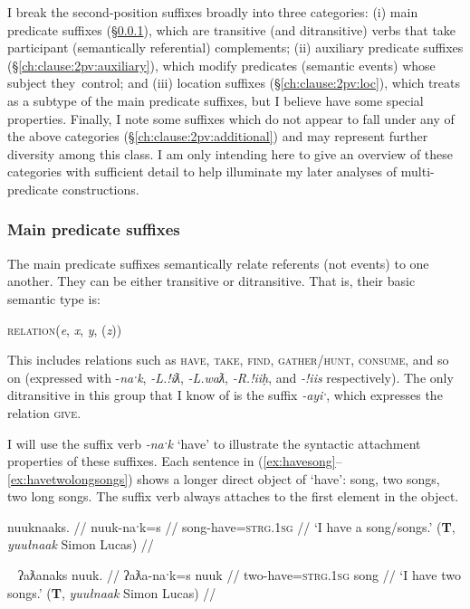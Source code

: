 I break the second-position suffixes broadly into three categories: (i) main predicate suffixes (\S\ref{ch:clause:2pv:mainpredicate}), which are transitive (and ditransitive) verbs that take participant (semantically referential) complements; (ii) auxiliary predicate suffixes (\S\ref{ch:clause:2pv:auxiliary}), which modify predicates (semantic events) whose subject they control; and (iii) location suffixes (\S\ref{ch:clause:2pv:loc}), which \citet{wojdak2005} treats as a subtype of the main predicate suffixes, but I believe have some special properties. Finally, I note some suffixes which do not appear to fall under any of the above categories (\S\ref{ch:clause:2pv:additional}) and may represent further diversity among this class. I am only intending here to give an overview of these categories with sufficient detail to help illuminate my later analyses of multi-predicate constructions.

\subsubsection{Main predicate suffixes} \label{ch:clause:2pv:mainpredicate}

The main predicate suffixes semantically relate referents (not events) to one another. They can be either transitive or ditransitive. That is, their basic semantic type is:

\ex
\textsc{relation}(\textit{e}, \textit{x}, \textit{y}, (\textit{z}))
\xe

\noindent This includes relations such as \textsc{have}, \textsc{take}, \textsc{find}, \textsc{gather/hunt}, \textsc{consume}, and so on (expressed with -\textit{naˑk}, \textit{-L.!iƛ}, \textit{-L.waƛ}, \textit{-R.!iiḥ}, and \textit{-!iis} respectively). The only ditransitive in this group that I know of is the suffix \textit{-ayiˑ}, which expresses the relation \textsc{give}.

I will use the suffix verb \textit{-naˑk} `have' to illustrate the syntactic attachment properties of these suffixes. Each sentence in (\ref{ex:havesong}--\ref{ex:havetwolongsongs}) shows a longer direct object of `have': song, two songs, two long songs. The suffix verb always attaches to the first element in the object.

\ex \label{ex:havesong}
\begingl
\glpreamble nuuknaaks. //
\gla nuuk-naˑk=s //
\glb song-have=\textsc{strg.1sg} //
\glft `I have a song/songs.' (\textbf{T}, \textit{yuułnaak} Simon Lucas) //
\endgl
\xe

\ex~ \label{ex:havetwosongs}
\begingl
\glpreamble ʔaƛanaks nuuk. //
\gla ʔaƛa-naˑk=s nuuk //
\glb two-have=\textsc{strg.1sg} song //
\glft `I have two songs.' (\textbf{T}, \textit{yuułnaak} Simon Lucas) //
\endgl
\xe

